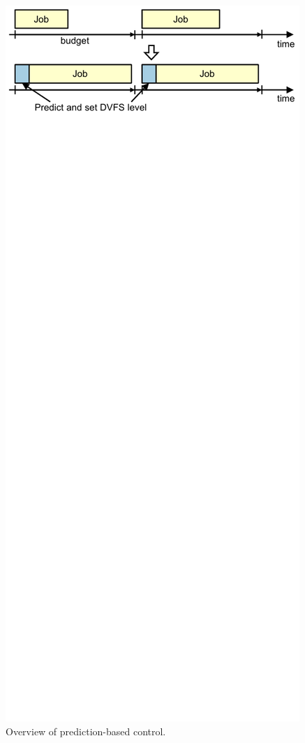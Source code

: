 \begin{figure}
  \begin{center}
    \includegraphics{exec_time_prediction/figs/prediction_overview.pdf}
    \caption{Overview of prediction-based control.}
    \label{fig:applications.prediction_overview}
  \end{center}
\end{figure}

